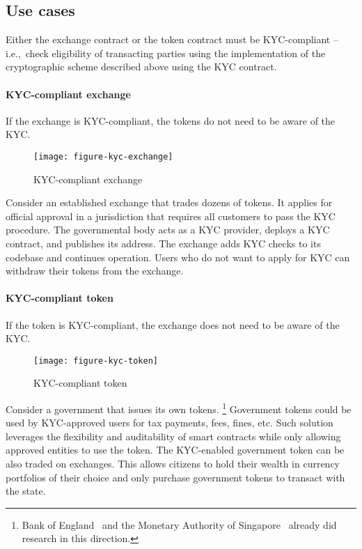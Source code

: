\subsection{Use cases}

Either the exchange contract or the token contract must be KYC-compliant -- i.e.,~check eligibility of transacting parties using the implementation of the cryptographic scheme described above using the KYC contract.

\paragraph{KYC-compliant exchange}

If the exchange is KYC-compliant, the tokens do not need to be aware of the KYC.

\begin{figure}[h]
	\caption{KYC-compliant exchange}
	\centering
	\texttt{[image: figure-kyc-exchange]}
\end{figure}

Consider an established exchange that trades dozens of tokens.
It applies for official approval in a jurisdiction that requires all customers to pass the KYC procedure.
The governmental body acts as a KYC provider, deploys a KYC contract, and publishes its address.
The exchange adds KYC checks to its codebase and continues operation.
Users who do not want to apply for KYC can withdraw their tokens from the exchange.


\paragraph{KYC-compliant token}

If the token is KYC-compliant, the exchange does not need to be aware of the KYC.

\begin{figure}[h]
	\caption{KYC-compliant token}
	\centering
	\texttt{[image: figure-kyc-token]}
\end{figure}

Consider a government that issues its own tokens.
\footnote{Bank of England~\cite{Danezis2016} and the Monetary Authority of Singapore~\cite{Singapore17} already did research in this direction.}
Government tokens could be used by KYC-approved users for tax payments, fees, fines, etc.
Such solution leverages the flexibility and auditability of smart contracts while only allowing approved entities to use the token.
The KYC-enabled government token can be also traded on exchanges.
This allows citizens to hold their wealth in currency portfolios of their choice and only purchase government tokens to transact with the state.

